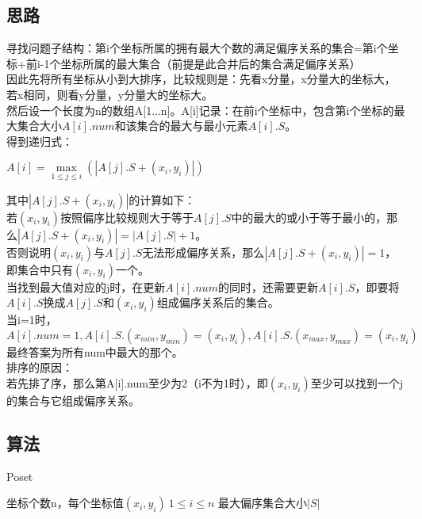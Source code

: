 \documentclass[UTF8]{ctexart}
\begin{document}
\subsection{思路}
寻找问题子结构：第i个坐标所属的拥有最大个数的满足偏序关系的集合=第i个坐标+前i-1个坐标所属的最大集合（前提是此合并后的集合满足偏序关系）\\
因此先将所有坐标从小到大排序，比较规则是：先看x分量，x分量大的坐标大，若x相同，则看y分量，y分量大的坐标大。\\
然后设一个长度为n的数组A[1...n]。A[i]记录：在前i个坐标中，包含第i个坐标的最大集合大小$A[i].num$和该集合的最大与最小元素$A[i].S$。\\
得到递归式：\\
\begin{center}
$A[i] = \max\limits_{1\leq j\leq i}(|A[j].S+(x_i, y_i)|)$
\end{center}
其中$|A[j].S+(x_i, y_i)|$的计算如下：\\
若$(x_i,y_i)$按照偏序比较规则大于等于$A[j].S$中的最大的或小于等于最小的，那么$|A[j].S+(x_i, y_i)|=|A[j].S|+1$。\\
否则说明$(x_i,y_i)$与$A[j].S$无法形成偏序关系，那么$|A[j].S+(x_i, y_i)|=1$，即集合中只有$(x_i, y_i)$一个。\\

当找到最大值对应的j时，在更新$A[i].num$的同时，还需要更新$A[i].S$，即要将$A[i].S$换成$A[j].S$和$(x_i,y_i)$组成偏序关系后的集合。\\
当i=1时，$A[i].num=1,A[i].S.(x_{min}, y_{min})=(x_i,y_i),A[i].S.(x_{max}, y_{max})=(x_i,y_i)$\\
最终答案为所有num中最大的那个。\\

排序的原因：\\
若先排了序，那么第A[i].num至少为2（i不为1时），即$(x_i,y_i)$至少可以找到一个j的集合与它组成偏序关系。
\subsection{算法}
\renewcommand{\algorithmicrequire}{\textbf{输入:}}
\renewcommand{\algorithmicensure}{\textbf{输出:}}
\begin{algorithm}
	\caption{Poset}
	\begin{algorithmic}[1]
	\Require 坐标个数n，每个坐标值$(x_i,y_i)\ 1\leq i \leq n$
	\Ensure 最大偏序集合大小$|S|$
				\EndIf
			\EndIf
		\EndFor
		\EndIf
	\EndFor\\
	\end{algorithmic}
\end{algorithm}
\end{document}
